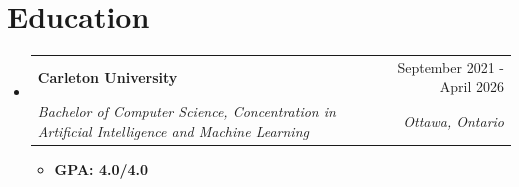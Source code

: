 \documentclass[letterpaper,11pt,usenames,dvipsnames]{article}
\makeatletter
\newcommand{\resumeItem}[1]{
  \item\small{
    {#1 \vspace{-2.41pt}}
  }
}
\newcommand{\resumeSubheading}[4]{
  \vspace{-1.5pt}\item
    \begin{tabular*}{0.97\textwidth}[t]{l@{\extracolsep{\fill}}r}
      \textbf{#1} & #2 \\
      \textit{\small#3} & \textit{\small #4 } \\
    \end{tabular*}\vspace{-7pt}
}
\newcommand{\resumeProjectHeading}[2]{
    \item
    \begin{tabular*}{0.97\textwidth}{l@{\extracolsep{\fill}}r}
      \small#1 & #2 \\
    \end{tabular*}\vspace{-7pt}
}
\newcommand{\resumeSubHeadingListStart}{\begin{itemize}[leftmargin=0.15in, label={}]}
\newcommand{\resumeSubHeadingListEnd}{\end{itemize}}
\newcommand{\resumeItemListStart}{\begin{itemize}[leftmargin=0.15in]}
\newcommand{\resumeItemListEnd}{\end{itemize}\vspace{-7pt}}
\makeatother
\begin{document}
       

       
       


\section{Education}
  \resumeSubHeadingListStart
    \resumeSubheading
      {Carleton University}
      {September 2021 - April 2026}
      {Bachelor of Computer Science, Concentration in Artificial Intelligence and Machine Learning}{Ottawa, Ontario}
      \resumeItemListStart
        \resumeItem{\textbf{GPA: 4.0/4.0}}
    \resumeItemListEnd
  \resumeSubHeadingListEnd
\end{document}
